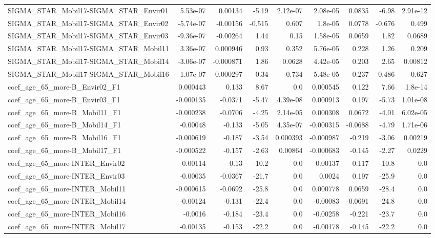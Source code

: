 \begin{tabular}{lrrrrrrrr}
SIGMA_STAR_Mobil17-SIGMA_STAR_Envir01 & 5.53e-07 & 0.00134 & -5.19 & 2.12e-07 & 2.08e-05 & 0.0835 & -6.98 & 2.91e-12 \\
SIGMA_STAR_Mobil17-SIGMA_STAR_Envir02 & -5.74e-07 & -0.00156 & -0.515 & 0.607 & 1.8e-05 & 0.0778 & -0.676 & 0.499 \\
SIGMA_STAR_Mobil17-SIGMA_STAR_Envir03 & -9.36e-07 & -0.00264 & 1.44 & 0.15 & 1.58e-05 & 0.0659 & 1.82 & 0.0689 \\
SIGMA_STAR_Mobil17-SIGMA_STAR_Mobil11 & 3.36e-07 & 0.000946 & 0.93 & 0.352 & 5.76e-05 & 0.228 & 1.26 & 0.209 \\
SIGMA_STAR_Mobil17-SIGMA_STAR_Mobil14 & -3.06e-07 & -0.000871 & 1.86 & 0.0628 & 4.42e-05 & 0.203 & 2.65 & 0.00812 \\
SIGMA_STAR_Mobil17-SIGMA_STAR_Mobil16 & 1.07e-07 & 0.000297 & 0.34 & 0.734 & 5.48e-05 & 0.237 & 0.486 & 0.627 \\
coef_age_65_more-B_Envir02_F1 & 0.000443 & 0.133 & 8.67 & 0.0 & 0.000545 & 0.122 & 7.66 & 1.8e-14 \\
coef_age_65_more-B_Envir03_F1 & -0.000135 & -0.0371 & -5.47 & 4.39e-08 & 0.000913 & 0.197 & -5.73 & 1.01e-08 \\
coef_age_65_more-B_Mobil11_F1 & -0.000238 & -0.0706 & -4.25 & 2.14e-05 & 0.000308 & 0.0672 & -4.01 & 6.02e-05 \\
coef_age_65_more-B_Mobil14_F1 & -0.00048 & -0.133 & -5.05 & 4.35e-07 & -0.000315 & -0.0688 & -4.79 & 1.71e-06 \\
coef_age_65_more-B_Mobil16_F1 & -0.000619 & -0.187 & -3.54 & 0.000393 & -0.000987 & -0.219 & -3.06 & 0.00219 \\
coef_age_65_more-B_Mobil17_F1 & -0.000522 & -0.157 & -2.63 & 0.00864 & -0.000683 & -0.145 & -2.27 & 0.0229 \\
coef_age_65_more-INTER_Envir02 & 0.00114 & 0.13 & -10.2 & 0.0 & 0.00137 & 0.117 & -10.8 & 0.0 \\
coef_age_65_more-INTER_Envir03 & -0.00035 & -0.0367 & -21.7 & 0.0 & 0.0024 & 0.197 & -25.9 & 0.0 \\
coef_age_65_more-INTER_Mobil11 & -0.000615 & -0.0692 & -25.8 & 0.0 & 0.000778 & 0.0659 & -28.4 & 0.0 \\
coef_age_65_more-INTER_Mobil14 & -0.00124 & -0.131 & -22.4 & 0.0 & -0.00083 & -0.0691 & -24.8 & 0.0 \\
coef_age_65_more-INTER_Mobil16 & -0.0016 & -0.184 & -23.4 & 0.0 & -0.00258 & -0.221 & -23.7 & 0.0 \\
coef_age_65_more-INTER_Mobil17 & -0.00135 & -0.153 & -22.2 & 0.0 & -0.00178 & -0.145 & -22.2 & 0.0 \\

\end{tabular}
